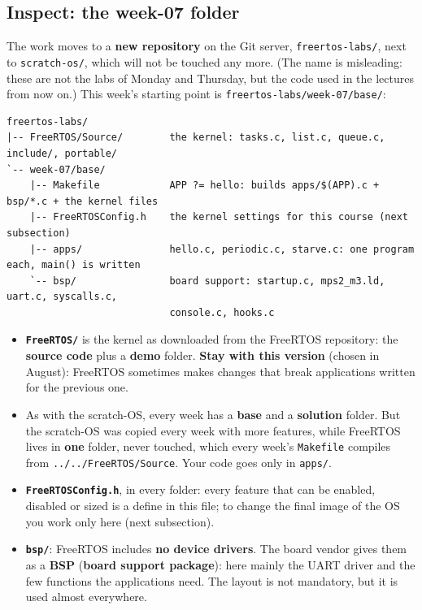 \subsection{Inspect: the week-07 folder}
The work moves to a \textbf{new repository} on the Git server, \texttt{freertos-labs/}, next to \texttt{scratch-os/}, which will not be touched any more. (The name is misleading: these are not the labs of Monday and Thursday, but the code used in the lectures from now on.) This week's starting point is \texttt{freertos-labs/week-07/base/}:
{\verbatimscriptsize
\begin{verbatim}
freertos-labs/
|-- FreeRTOS/Source/        the kernel: tasks.c, list.c, queue.c, include/, portable/
`-- week-07/base/
    |-- Makefile            APP ?= hello: builds apps/$(APP).c + bsp/*.c + the kernel files
    |-- FreeRTOSConfig.h    the kernel settings for this course (next subsection)
    |-- apps/               hello.c, periodic.c, starve.c: one program each, main() is written
    `-- bsp/                board support: startup.c, mps2_m3.ld, uart.c, syscalls.c,
                            console.c, hooks.c
\end{verbatim}}
\begin{itemize}
    \item \textbf{\texttt{FreeRTOS/}} is the kernel as downloaded from the FreeRTOS repository: the \textbf{source code} plus a \textbf{demo} folder. \textbf{Stay with this version} (chosen in August): FreeRTOS sometimes makes changes that break applications written for the previous one.
    \item As with the scratch-OS, every week has a \textbf{base} and a \textbf{solution} folder. But the scratch-OS was copied every week with more features, while FreeRTOS lives in \textbf{one} folder, never touched, which every week's \texttt{Makefile} compiles from \texttt{../../FreeRTOS/Source}. Your code goes only in \texttt{apps/}.
    \item \textbf{\texttt{FreeRTOSConfig.h}}, in every folder: every feature that can be enabled, disabled or sized is a define in this file; to change the final image of the OS you work only here (next subsection).
    \item \textbf{\texttt{bsp/}}: FreeRTOS includes \textbf{no device drivers}. The board vendor gives them as a \textbf{BSP} (\textbf{board support package}): here mainly the UART driver and the few functions the applications need. The layout is not mandatory, but it is used almost everywhere.
\end{itemize}

